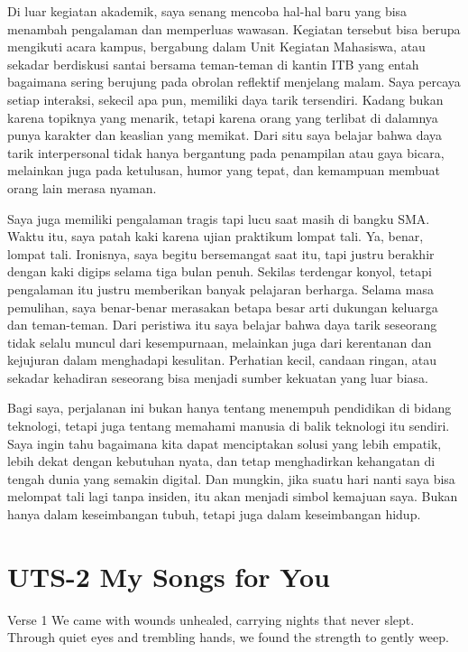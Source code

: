 \documentclass[
  letterpaper,
  DIV=11,
  numbers=noendperiod]{scrreprt}
\begin{document}
Di luar kegiatan akademik, saya senang mencoba hal-hal baru yang bisa
menambah pengalaman dan memperluas wawasan. Kegiatan tersebut bisa
berupa mengikuti acara kampus, bergabung dalam Unit Kegiatan Mahasiswa,
atau sekadar berdiskusi santai bersama teman-teman di kantin ITB yang
entah bagaimana sering berujung pada obrolan reflektif menjelang malam.
Saya percaya setiap interaksi, sekecil apa pun, memiliki daya tarik
tersendiri. Kadang bukan karena topiknya yang menarik, tetapi karena
orang yang terlibat di dalamnya punya karakter dan keaslian yang
memikat. Dari situ saya belajar bahwa daya tarik interpersonal tidak
hanya bergantung pada penampilan atau gaya bicara, melainkan juga pada
ketulusan, humor yang tepat, dan kemampuan membuat orang lain merasa
nyaman.

Saya juga memiliki pengalaman tragis tapi lucu saat masih di bangku SMA.
Waktu itu, saya patah kaki karena ujian praktikum lompat tali. Ya,
benar, lompat tali. Ironisnya, saya begitu bersemangat saat itu, tapi
justru berakhir dengan kaki digips selama tiga bulan penuh. Sekilas
terdengar konyol, tetapi pengalaman itu justru memberikan banyak
pelajaran berharga. Selama masa pemulihan, saya benar-benar merasakan
betapa besar arti dukungan keluarga dan teman-teman. Dari peristiwa itu
saya belajar bahwa daya tarik seseorang tidak selalu muncul dari
kesempurnaan, melainkan juga dari kerentanan dan kejujuran dalam
menghadapi kesulitan. Perhatian kecil, candaan ringan, atau sekadar
kehadiran seseorang bisa menjadi sumber kekuatan yang luar biasa.

Bagi saya, perjalanan ini bukan hanya tentang menempuh pendidikan di
bidang teknologi, tetapi juga tentang memahami manusia di balik
teknologi itu sendiri. Saya ingin tahu bagaimana kita dapat menciptakan
solusi yang lebih empatik, lebih dekat dengan kebutuhan nyata, dan tetap
menghadirkan kehangatan di tengah dunia yang semakin digital. Dan
mungkin, jika suatu hari nanti saya bisa melompat tali lagi tanpa
insiden, itu akan menjadi simbol kemajuan saya. Bukan hanya dalam
keseimbangan tubuh, tetapi juga dalam keseimbangan hidup.


\chapter{UTS-2 My Songs for You}\label{uts-2-my-songs-for-you}

Verse 1 We came with wounds unhealed, carrying nights that never slept.
Through quiet eyes and trembling hands, we found the strength to gently
weep.
\end{document}
